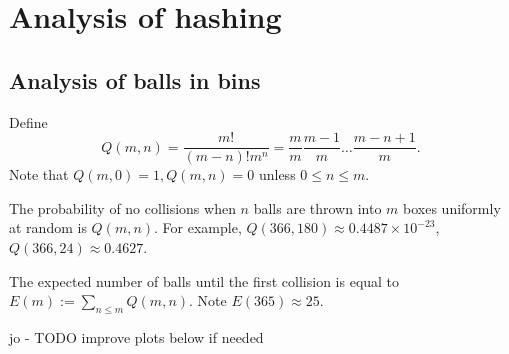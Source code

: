 \chapter{Analysis of hashing} %

\section*{Analysis of balls in bins}
Define 
$$Q(m, n) = \frac{m!}{(m-n)! m^n} = \frac{m}{m} \frac{m-1}{m} \dots 
\frac{m - n + 1}{m}.$$
Note that $Q(m,0) = 1, Q(m, n) = 0$ unless $0 \leq n \leq m$.

The probability of no collisions when $n$ balls are thrown into $m$ boxes 
uniformly at random is $Q(m, n)$. For example, $Q(366, 180) \approx 0.4487
 \times 10^{-23}$, $Q(366, 24) \approx  0.4627$. 

The expected number of balls until the first collision is equal to 
$E(m):=\sum_{n \leq m} Q(m, n)$. Note $E(365) \approx 25$.

jo - TODO improve plots below if needed

